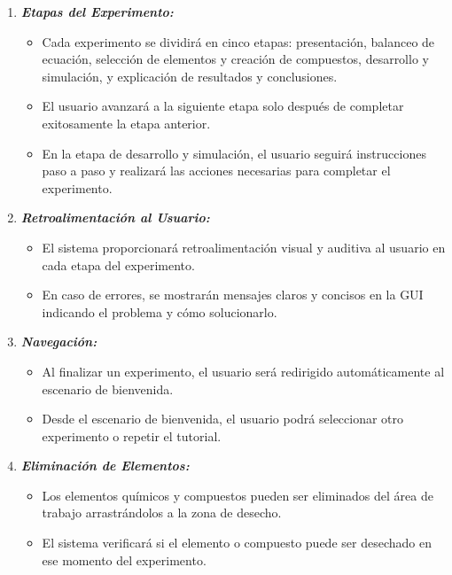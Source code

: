 \begin{enumerate}[{RN-}01. ]
    \item \textit{\textbf{Etapas del Experimento: }}
    \begin{itemize}
        \item Cada experimento se dividirá en cinco etapas: presentación, balanceo de ecuación, selección de elementos y creación de compuestos, desarrollo y simulación, y explicación de resultados y conclusiones. 
        \item El usuario avanzará a la siguiente etapa solo después de completar exitosamente la etapa anterior. 
        \item En la etapa de desarrollo y simulación, el usuario seguirá instrucciones paso a paso y realizará las acciones necesarias para completar el experimento. 
    \end{itemize}
    \newpage
    \item \textit{\textbf{Retroalimentación al Usuario: }}
    \begin{itemize}
        \item El sistema proporcionará retroalimentación visual y auditiva al usuario en cada etapa del experimento. 
        \item En caso de errores, se mostrarán mensajes claros y concisos en la GUI indicando el problema y cómo solucionarlo. 
    \end{itemize}
    
    \item \textit{\textbf{Navegación:}}  
    \begin{itemize}
        \item Al finalizar un experimento, el usuario será redirigido automáticamente al escenario de bienvenida. 
        \item Desde el escenario de bienvenida, el usuario podrá seleccionar otro experimento o repetir el tutorial.
    \end{itemize}

    \item \textit{\textbf{Eliminación de Elementos: }}
    \begin{itemize}
        \item Los elementos químicos y compuestos pueden ser eliminados del área de trabajo arrastrándolos a la zona de desecho. 
        \item El sistema verificará si el elemento o compuesto puede ser desechado en ese momento del experimento. 
    \end{itemize}


\end{enumerate}
